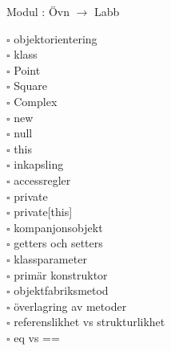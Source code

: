 
Modul : Övn  $\rightarrow$ Labb 
\begin{multicols}{3}\SlideFontTiny
$\square$ objektorientering \\
$\square$ klass \\
$\square$ Point \\
$\square$ Square \\
$\square$ Complex \\
$\square$ new \\
$\square$ null \\
$\square$ this \\
$\square$ inkapsling \\
$\square$ accessregler \\
$\square$ private \\
$\square$ private[this] \\
$\square$ kompanjonsobjekt \\
$\square$ getters och setters \\
$\square$ klassparameter \\
$\square$ primär konstruktor \\
$\square$ objektfabriksmetod \\
$\square$ överlagring av metoder \\
$\square$ referenslikhet vs strukturlikhet \\
$\square$ eq vs == \\     
\end{multicols}
